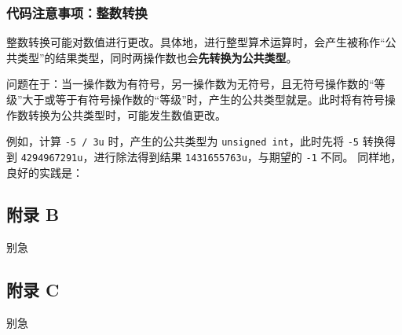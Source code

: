 \begin{frame}
  \frametitle{\textbf{代码注意事项}：整数转换}
  \alert{整数转换}可能对数值进行更改。具体地，进行整型算术运算时，会产生被称作“\alert{公共类型}”的结果类型，同时两操作数也会\textbf{先转换为公共类型}。
  
  \emptyline
  问题在于：当一操作数为有符号，另一操作数为无符号，且无符号操作数的“等级”大于或等于有符号操作数的“等级”时，产生的公共类型就是。此时将有符号操作数转换为公共类型时，可能发生数值更改。
  \pause
  
  \emptyline
  例如，计算 \texttt{-5 / 3u} 时，产生的公共类型为 \texttt{unsigned int}，此时先将 \texttt{-5} 转换得到 \texttt{4294967291u}，进行除法得到结果 \texttt{1431655763u}，与期望的 \texttt{-1} 不同。
  \pause
  同样地，良好的实践是：
  \begin{center}
  \end{center}
\end{frame}
\subsection*{附录 B}
\begin{frame}{别急}\end{frame} %
\subsection*{附录 C}
\begin{frame}{别急}\end{frame} %

